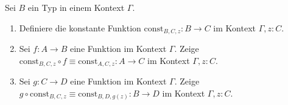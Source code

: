 \documentclass{uebung}
\begin{document}
\begin{exercise}
  Sei $B$ ein Typ in einem Kontext $\Gamma$.
  \begin{enumerate}
    \item Definiere die konstante Funktion $\mathrm{const}_{B,C,z}:B\to C$ im Kontext $\Gamma,z:C$.
    \item Sei $f:A\to B$ eine Funktion im Kontext $\Gamma$.
      Zeige $\mathrm{const}_{B,C,z}\circ f \equiv \mathrm{const}_{A,C,z}:A\to C$ im Kontext $\Gamma,z:C$.
    \item Sei $g:C\to D$ eine Funktion im Kontext $\Gamma$.
      Zeige $g\circ\mathrm{const}_{B,C,z} \equiv \mathrm{const}_{B,D,g(z)}:B\to D$ im Kontext $\Gamma,z:C$.
  \end{enumerate}
\end{exercise}
\end{document}
